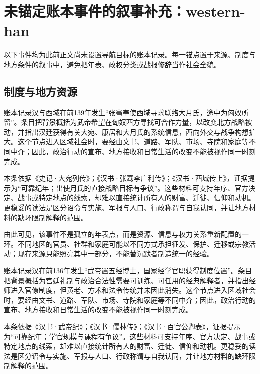 \section{未锚定账本事件的叙事补充：western-han}

\label{sec:anchor-batch-two-western-han}

以下事件均为此前正文尚未设置导航目标的账本记录。每一锚点置于来源、制度与地方条件的叙事中，避免把年表、政权分类或战报修辞当作社会全貌。

\subsection{制度与地方资源}

账本记录汉与西域在前139年发生“张骞奉使西域寻求联络大月氏，途中为匈奴所留”。条目把背景概括为武帝希望在匈奴西方寻找可合作力量，以改变北方战略被动，并指出汉廷获得有关大宛、康居和大月氏的系统信息，西向外交与战争构想扩大。这个节点进入区域社会时，要经由文书、道路、军队、市场、寺院和家庭等不同中介；因此，政治行动的宣布、地方接收和日常生活的改变不能被视作同一时刻完成。

本条依据《史记·大宛列传》；《汉书·张骞李广利传》；《汉书·西域传上》，证据提示为“可靠纪年；出使月氏的直接战略目标有争议”。这些材料可支持年序、官方决定、战事或特定地点的线索，却难以直接统计所有人的财富、迁徙、信仰和动机。更稳妥的读法是区分诏令与实施、军报与人口、行政称谓与自我认同，并让地方材料的缺环限制解释的范围。

由此可见，该事件不是孤立的年表点，而是资源、信息与权力关系重新配置的一环。不同地区的官员、社群和家庭可能以不同方式承担征发、保护、迁移或宗教活动；现存来源只能照亮其中一部分，不能替沉默者制造统一的经验。

账本记录汉在前136年发生“武帝置五经博士，国家经学官职获得制度位置”。条目把背景概括为宫廷礼制与政治合法性需要可训练、可任用的经典解释者，并指出经师进入官僚制度，但黄老、方术和法令传统并未因此消失。这个节点进入区域社会时，要经由文书、道路、军队、市场、寺院和家庭等不同中介；因此，政治行动的宣布、地方接收和日常生活的改变不能被视作同一时刻完成。

本条依据《汉书·武帝纪》；《汉书·儒林传》；《汉书·百官公卿表》，证据提示为“可靠纪年；学官规模与课程有争议”。这些材料可支持年序、官方决定、战事或特定地点的线索，却难以直接统计所有人的财富、迁徙、信仰和动机。更稳妥的读法是区分诏令与实施、军报与人口、行政称谓与自我认同，并让地方材料的缺环限制解释的范围。

